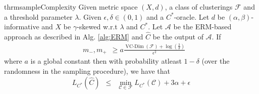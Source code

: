 \documentclass[12pt]{article}
\newcommand{\mc}{\mathcal}
\DeclareMathOperator*{\vcdim}{VC-Dim}
\begin{document}
\begin{restatable}{thrm}{sampleComplexity}
\label{thm:sampleComplexity}
Given metric space $(X, d)$, a class of clusterings $\mc F$ and a threshold parameter $\lambda$. Given $\epsilon, \delta \in (0, 1)$ and a $C^*$-oracle. Let $d$ be $(\alpha, \beta)$-informative and $X$ be $\gamma$-skewed w.r.t $\lambda$ and $C^*$. Let $\mc A$ be the ERM-based approach as described in Alg. \ref{alg:ERM} and $\hat C$ be the output of $\mc A$. If  
\begin{align}
  &m_-, m_+ \enspace \ge a\frac{\vcdim({\mc F}) + \log(\frac{2}{\delta})}{\epsilon^2} 
\end{align}
where $a$ is a global constant then with probability atleast $1-\delta$ (over the randomness in the sampling procedure), we have that $$L_{C^*}(\hat C) \enspace\le\enspace \min_{\mc C \in \mc F} L_{C^*}(\mc C) + 3\alpha + \epsilon$$
\end{restatable}
\end{document}
